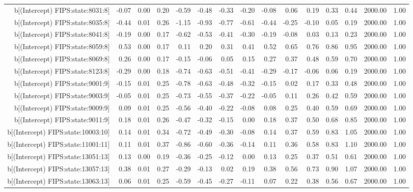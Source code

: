 \begin{table}[ht]
\begin{tabular}{rrrrrrrrrrrrrrr}
  b[(Intercept) FIPS:state:8031:8] & -0.07 & 0.00 & 0.20 & -0.59 & -0.48 & -0.33 & -0.20 & -0.08 & 0.06 & 0.19 & 0.33 & 0.44 & 2000.00 & 1.00 \\ 
  b[(Intercept) FIPS:state:8035:8] & -0.44 & 0.01 & 0.26 & -1.15 & -0.93 & -0.77 & -0.61 & -0.44 & -0.25 & -0.10 & 0.05 & 0.19 & 2000.00 & 1.00 \\ 
  b[(Intercept) FIPS:state:8041:8] & -0.19 & 0.00 & 0.17 & -0.62 & -0.53 & -0.41 & -0.30 & -0.19 & -0.08 & 0.03 & 0.13 & 0.23 & 2000.00 & 1.00 \\ 
  b[(Intercept) FIPS:state:8059:8] & 0.53 & 0.00 & 0.17 & 0.11 & 0.20 & 0.31 & 0.41 & 0.52 & 0.65 & 0.76 & 0.86 & 0.95 & 2000.00 & 1.00 \\ 
  b[(Intercept) FIPS:state:8069:8] & 0.26 & 0.00 & 0.17 & -0.15 & -0.06 & 0.05 & 0.15 & 0.27 & 0.37 & 0.48 & 0.59 & 0.70 & 2000.00 & 1.00 \\ 
  b[(Intercept) FIPS:state:8123:8] & -0.29 & 0.00 & 0.18 & -0.74 & -0.63 & -0.51 & -0.41 & -0.29 & -0.17 & -0.06 & 0.06 & 0.19 & 2000.00 & 1.00 \\ 
  b[(Intercept) FIPS:state:9001:9] & -0.15 & 0.01 & 0.25 & -0.78 & -0.63 & -0.48 & -0.32 & -0.15 & 0.02 & 0.17 & 0.33 & 0.48 & 2000.00 & 1.00 \\ 
  b[(Intercept) FIPS:state:9003:9] & -0.05 & 0.01 & 0.25 & -0.73 & -0.55 & -0.37 & -0.22 & -0.05 & 0.11 & 0.26 & 0.42 & 0.59 & 2000.00 & 1.00 \\ 
  b[(Intercept) FIPS:state:9009:9] & 0.09 & 0.01 & 0.25 & -0.56 & -0.40 & -0.22 & -0.08 & 0.08 & 0.25 & 0.40 & 0.59 & 0.69 & 2000.00 & 1.00 \\ 
  b[(Intercept) FIPS:state:9011:9] & 0.18 & 0.01 & 0.26 & -0.47 & -0.32 & -0.15 & 0.00 & 0.18 & 0.37 & 0.50 & 0.68 & 0.85 & 2000.00 & 1.00 \\ 
  b[(Intercept) FIPS:state:10003:10] & 0.14 & 0.01 & 0.34 & -0.72 & -0.49 & -0.30 & -0.08 & 0.14 & 0.37 & 0.59 & 0.83 & 1.05 & 2000.00 & 1.00 \\ 
  b[(Intercept) FIPS:state:11001:11] & 0.11 & 0.01 & 0.37 & -0.86 & -0.60 & -0.36 & -0.14 & 0.11 & 0.36 & 0.58 & 0.83 & 1.10 & 2000.00 & 1.00 \\ 
  b[(Intercept) FIPS:state:13051:13] & 0.13 & 0.00 & 0.19 & -0.36 & -0.25 & -0.12 & 0.00 & 0.13 & 0.25 & 0.37 & 0.51 & 0.61 & 2000.00 & 1.00 \\ 
  b[(Intercept) FIPS:state:13057:13] & 0.38 & 0.01 & 0.27 & -0.29 & -0.13 & 0.02 & 0.19 & 0.38 & 0.56 & 0.73 & 0.90 & 1.07 & 2000.00 & 1.00 \\ 
  b[(Intercept) FIPS:state:13063:13] & 0.06 & 0.01 & 0.25 & -0.59 & -0.45 & -0.27 & -0.11 & 0.07 & 0.22 & 0.38 & 0.56 & 0.67 & 2000.00 & 1.00 \\ 

\end{tabular}
\end{table}
